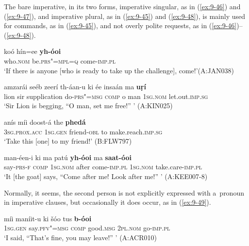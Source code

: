 The bare imperative, in its two forms, imperative singular, as in (\ref{ex:9-46}) and (\ref{ex:9-47}), and imperative plural, as in (\ref{ex:9-45}) and (\ref{ex:9-48}), is mainly used for commands, as in (\ref{ex:9-45}), and not overly polite requests, as in (\ref{ex:9-46})--(\ref{ex:9-48}).

\begin{exe}
\ex
\label{ex:9-45}
\gll koó hín=ee \textbf{yh-óoi}\\
who.\textsc{nom} be.\textsc{prs"=mpl=q} come-\textsc{imp.pl}\\
\glt `If there is anyone [who is ready to take up the challenge], come!'\newline (A:JAN038)

\ex
\label{ex:9-46}
\gll amzarái seéb zeerí th-áan-u ki ée insaán ma \textbf{uṛí}\\
lion sir supplication do-\textsc{prs"=msg} \textsc{comp} o man \textsc{1sg.nom} let.out.\textsc{imp.sg}\\
\glt `Sir Lion is begging, ``O man, set me free!'' ' (A:KIN025)

\ex
\label{ex:9-47}
\gll anís míi doost-á the \textbf{phedá} \\
\textsc{3sg.prox.acc} \textsc{1sg.gen} friend-\textsc{obl} to make.reach.\textsc{imp.sg}\\
\glt `Take this [one] to my friend!' (B:FLW797)

\ex
\label{ex:9-48}
\gll man-éen-i ki ma patú \textbf{yh-óoi} ma \textbf{saat-óoi} \\
say-\textsc{prs-f} \textsc{comp} \textsc{1sg.nom} after come-\textsc{imp.pl} \textsc{1sg.nom} take.care-\textsc{imp.pl} \\
\glt `It [the goat] says, ``Come after me! Look after me!'' ' (A:KEE007-8)
\end{exe}

Normally, it seems, the second person is not explicitly expressed with a~pronoun in imperative clauses, but occasionally it does occur, as in (\ref{ex:9-49}).

\begin{exe}
\ex
\label{ex:9-49}
\gll míi maníit-u ki šóo tus \textbf{b-óoi} \\
\textsc{1sg.gen} say.\textsc{pfv"=msg} \textsc{comp} good.\textsc{msg} \textsc{2pl.nom} go-\textsc{imp.pl} \\
\glt `I said, ``That's fine, you may leave!'' ' (A:ACR010)
\end{exe}


